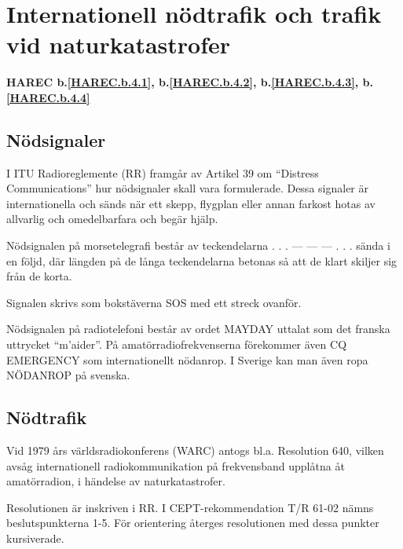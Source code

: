 \section{Internationell nödtrafik och trafik vid naturkatastrofer}
\textbf{
HAREC b.\ref{HAREC.b.4.1}\label{myHAREC.b.4.1},
 b.\ref{HAREC.b.4.2}\label{myHAREC.b.4.2},
 b.\ref{HAREC.b.4.3}\label{myHAREC.b.4.3},
 b.\ref{HAREC.b.4.4}\label{myHAREC.b.4.4}
}

\subsection{Nödsignaler}

I ITU Radioreglemente (RR) framgår av Artikel 39 om ``Distress Communications''
hur nödsignaler skall vara formulerade. Dessa signaler är internationella och
sänds när ett skepp, flygplan eller annan farkost hotas av allvarlig och
omedelbarfara och begär hjälp.

Nödsignalen på morsetelegrafi består av teckendelarna . . . --- --- --- . . .
sända i en följd, där längden på de långa teckendelarna betonas så att de klart
skiljer sig från de korta.

Signalen skrivs som bokstäverna SOS med ett streck ovanför.

Nödsignalen på radiotelefoni består av ordet MAYDAY uttalat som det franska
uttrycket ``m'aider''.  På amatörradiofrekvenserna förekommer även CQ EMERGENCY
som internationellt nödanrop. I Sverige kan man även ropa NÖDANROP på svenska.

\subsection{Nödtrafik}

Vid 1979 års världsradiokonferens (WARC) antogs bl.a. Resolution 640, vilken
avsåg internationell radiokommunikation på frekvensband upplåtna åt
amatörradion, i händelse av naturkatastrofer.

Resolutionen är inskriven i RR. I CEPT-rekommendation T/R 61-02 nämns
beslutspunkterna 1-5. För orientering återges resolutionen med dessa punkter
kursiverade.

